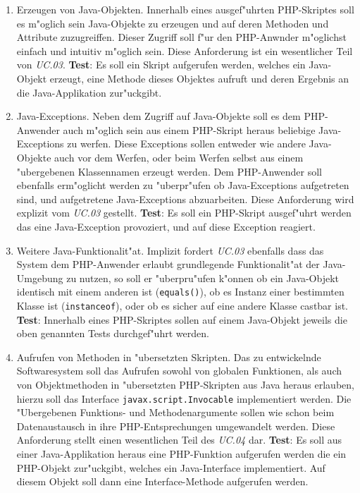\begin{enumerate}
\item Erzeugen von Java-Objekten. Innerhalb eines ausgef"uhrten PHP-Skriptes soll es m"oglich sein Java-Objekte zu erzeugen und auf
    deren Methoden und Attribute zuzugreiffen. Dieser Zugriff soll f"ur den PHP-Anwnder m"oglichst einfach und intuitiv m"oglich sein.
    Diese Anforderung ist ein wesentlicher Teil von \emph{UC.03}.
    \textbf{Test}: Es soll ein Skript aufgerufen werden, welches ein Java-Objekt erzeugt, eine Methode dieses Objektes aufruft und
    deren Ergebnis an die Java-Applikation zur"uckgibt.

\item Java-Exceptions. Neben dem Zugriff auf Java-Objekte soll es dem PHP-Anwender auch m"oglich sein aus einem
    PHP-Skript heraus beliebige Java-Exceptions zu werfen. Diese Exceptions sollen entweder wie andere Java-Objekte auch vor dem Werfen,
    oder beim Werfen selbst aus einem "ubergebenen Klassennamen erzeugt werden. Dem PHP-Anwender soll ebenfalls erm"oglicht werden
    zu "uberpr"ufen ob Java-Exceptions aufgetreten sind, und aufgetretene Java-Exceptions abzuarbeiten.
    Diese Anforderung wird explizit vom \emph{UC.03} gestellt.
    \textbf{Test}: Es soll ein PHP-Skript ausgef"uhrt werden das eine Java-Exception provoziert, und auf diese Exception reagiert.

\item Weitere Java-Funktionalit"at. Implizit fordert \emph{UC.03} ebenfalls dass das System dem PHP-Anwender erlaubt grundlegende
    Funktionalit"at der Java-Umgebung zu nutzen, so soll er "uberpru"ufen k"onnen ob ein Java-Objekt identisch mit einem anderen ist
    (\texttt{equals()}), ob es Instanz einer bestimmten Klasse ist (\texttt{instanceof}), oder ob es sicher auf eine andere Klasse castbar ist.
    \textbf{Test}: Innerhalb eines PHP-Skriptes sollen auf einem Java-Objekt jeweils die oben genannten Tests durchgef"uhrt werden.

\item Aufrufen von Methoden in "ubersetzten Skripten. Das zu entwickelnde Softwaresystem soll das Aufrufen sowohl von globalen Funktionen,
    als auch von Objektmethoden in "ubersetzten PHP-Skripten aus Java heraus erlauben, hierzu soll das Interface \texttt{javax.script.Invocable} 
    implementiert werden. Die "Ubergebenen Funktions- und Methodenargumente sollen wie schon beim Datenaustausch in ihre PHP-Entsprechungen
    umgewandelt werden. Diese Anforderung stellt einen wesentlichen Teil des \emph{UC.04} dar.
    \textbf{Test}: Es soll aus einer Java-Applikation heraus eine PHP-Funktion aufgerufen werden die ein PHP-Objekt zur"uckgibt, welches
    ein Java-Interface implementiert. Auf diesem Objekt soll dann eine Interface-Methode aufgerufen werden.


\end{enumerate}
